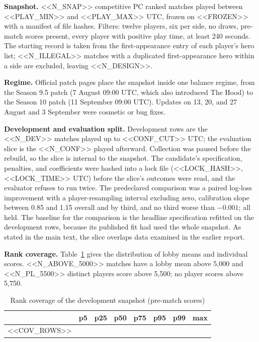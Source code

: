 \documentclass[11pt]{article}
\begin{document}
\textbf{Snapshot.} <<N_SNAP>> competitive PC ranked matches played between <<PLAY_MIN>> and <<PLAY_MAX>>
UTC, frozen on <<FROZEN>> with a manifest of file hashes. Filters: twelve players, six per side, no draws,
pre-match scores present, every player with positive play time, at least 240 seconds. The starting record
is taken from the first-appearance entry of each player's hero list; <<N_ILLEGAL>> matches with a
duplicated first-appearance hero within a side are excluded, leaving <<N_DESIGN>>.

\textbf{Regime.} Official patch pages place the snapshot inside one balance regime, from the Season 9.5
patch (7 August 09:00 UTC, which also introduced The Hood) to the Season 10 patch (11 September 09:00
UTC). Updates on 13, 20, and 27 August and 3 September were cosmetic or bug fixes.

\textbf{Development and evaluation split.} Development rows are the <<N_DEV>> matches played up to
<<CONF_CUT>> UTC; the evaluation slice is the <<N_CONF>> played afterward. Collection was paused before
the rebuild, so the slice is internal to the snapshot. The candidate's specification, penalties, and
coefficients were hashed into a lock file (<<LOCK_HASH>>, <<LOCK_TIME>> UTC) before the slice's outcomes
were read, and the evaluator refuses to run twice. The predeclared comparison was a paired log-loss
improvement with a player-resampling interval excluding zero, calibration slope between 0.85 and 1.15
overall and by third, and no third worse than $-0.001$; all held. The baseline for the comparison is the
headline specification refitted on the development rows, because its published fit had used the whole
snapshot. As stated in the main text, the slice overlaps data examined in the earlier report.

\textbf{Rank coverage.} Table~\ref{tab:cov} gives the distribution of lobby means and individual scores.
<<N_ABOVE_5000>> matches have a lobby mean above 5{,}000 and <<N_PL_5500>> distinct players score above
5{,}500; no player scores above 5{,}750.

\begin{table}[H]\centering\small
\caption{Rank coverage of the development snapshot (pre-match scores)}\label{tab:cov}
\begin{tabular}{l r r r r r r r}
\toprule
& p5 & p25 & p50 & p75 & p95 & p99 & max \\
\midrule
<<COV_ROWS>>
\bottomrule
\end{tabular}
\end{table}
\end{document}
